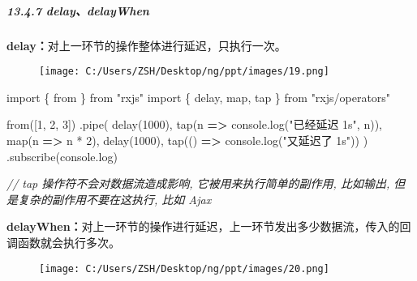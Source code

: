 \documentclass[
]{article}
\newenvironment{Shaded}{}{}
\newcommand{\BuiltInTok}[1]{#1}
\newcommand{\CommentTok}[1]{\textcolor[rgb]{0.38,0.63,0.69}{\textit{#1}}}
\newcommand{\DecValTok}[1]{\textcolor[rgb]{0.25,0.63,0.44}{#1}}
\newcommand{\FunctionTok}[1]{\textcolor[rgb]{0.02,0.16,0.49}{#1}}
\newcommand{\ImportTok}[1]{#1}
\newcommand{\KeywordTok}[1]{\textcolor[rgb]{0.00,0.44,0.13}{\textbf{#1}}}
\newcommand{\NormalTok}[1]{#1}
\newcommand{\OperatorTok}[1]{\textcolor[rgb]{0.40,0.40,0.40}{#1}}
\newcommand{\StringTok}[1]{\textcolor[rgb]{0.25,0.44,0.63}{#1}}
\begin{document}
\hypertarget{1347-delaydelaywhen}{%
\subparagraph{13.4.7 delay、delayWhen}\label{1347-delaydelaywhen}}

\textbf{delay：}对上一环节的操作整体进行延迟，只执行一次。

\begin{figure}
\centering
\texttt{[image: C:/Users/ZSH/Desktop/ng/ppt/images/19.png]}
\caption{}
\end{figure}

\begin{Shaded}
\begin{Highlighting}[]
\ImportTok{import}\NormalTok{ \{ }\ImportTok{from}\NormalTok{ \} }\ImportTok{from} \StringTok{"rxjs"}
\ImportTok{import}\NormalTok{ \{ delay}\OperatorTok{,}\NormalTok{ map}\OperatorTok{,}\NormalTok{ tap \} }\ImportTok{from} \StringTok{"rxjs/operators"}

\ImportTok{from}\NormalTok{([}\DecValTok{1}\OperatorTok{,} \DecValTok{2}\OperatorTok{,} \DecValTok{3}\NormalTok{])}
  \OperatorTok{.}\FunctionTok{pipe}\NormalTok{(}
    \FunctionTok{delay}\NormalTok{(}\DecValTok{1000}\NormalTok{)}\OperatorTok{,}
    \FunctionTok{tap}\NormalTok{(n }\KeywordTok{=\textgreater{}} \BuiltInTok{console}\OperatorTok{.}\FunctionTok{log}\NormalTok{(}\StringTok{"已经延迟 1s"}\OperatorTok{,}\NormalTok{ n))}\OperatorTok{,}
    \FunctionTok{map}\NormalTok{(n }\KeywordTok{=\textgreater{}}\NormalTok{ n }\OperatorTok{*} \DecValTok{2}\NormalTok{)}\OperatorTok{,}
    \FunctionTok{delay}\NormalTok{(}\DecValTok{1000}\NormalTok{)}\OperatorTok{,}
    \FunctionTok{tap}\NormalTok{(() }\KeywordTok{=\textgreater{}} \BuiltInTok{console}\OperatorTok{.}\FunctionTok{log}\NormalTok{(}\StringTok{"又延迟了 1s"}\NormalTok{))}
\NormalTok{  )}
  \OperatorTok{.}\FunctionTok{subscribe}\NormalTok{(}\BuiltInTok{console}\OperatorTok{.}\FunctionTok{log}\NormalTok{)}

\CommentTok{// tap 操作符不会对数据流造成影响, 它被用来执行简单的副作用, 比如输出, 但是复杂的副作用不要在这执行, 比如 Ajax}
\end{Highlighting}
\end{Shaded}

\textbf{delayWhen：}对上一环节的操作进行延迟，上一环节发出多少数据流，传入的回调函数就会执行多次。

\begin{figure}
\centering
\texttt{[image: C:/Users/ZSH/Desktop/ng/ppt/images/20.png]}
\caption{}
\end{figure}
\end{document}
